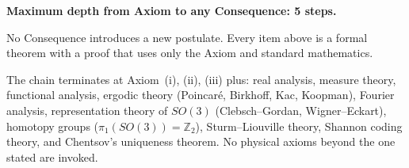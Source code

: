 \bigskip
\noindent
\textbf{Maximum depth from Axiom to any Consequence: 5 steps.}

No Consequence introduces a new postulate.  Every item above is a formal
theorem with a proof that uses only the Axiom and standard mathematics.

The chain terminates at Axiom~(i), (ii), (iii) plus: real analysis, measure
theory, functional analysis, ergodic theory (Poincar\'{e}, Birkhoff, Kac,
Koopman), Fourier analysis, representation theory of $SO(3)$
(Clebsch--Gordan, Wigner--Eckart), homotopy groups ($\pi_{1}(SO(3))=\mathbb{Z}_{2}$),
Sturm--Liouville theory, Shannon coding theory, and Chentsov's uniqueness theorem.
No physical axioms beyond the one stated are invoked.
